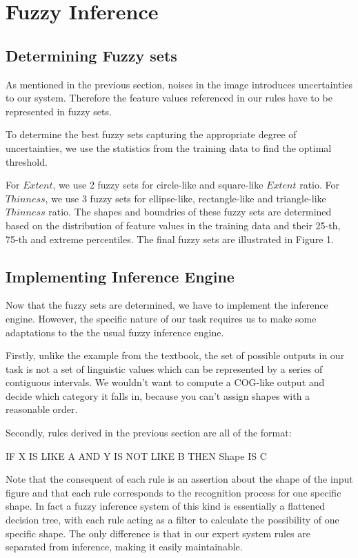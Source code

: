 \section{Fuzzy Inference}

\subsection{Determining Fuzzy sets}

As mentioned in the previous section, noises in the image introduces uncertainties to our system. Therefore the feature values referenced in our rules have to be represented in fuzzy sets.

To determine the best fuzzy sets capturing the appropriate degree of uncertainties, we use the statistics from the training data to find the optimal threshold.

For $Extent$, we use 2 fuzzy sets for circle-like and square-like $Extent$ ratio. For $Thinness$, we use 3 fuzzy sets for ellipse-like, rectangle-like and triangle-like $Thinness$ ratio. The shapes and boundries of these fuzzy sets are determined based on the distribution of feature values in the training data and their 25-th, 75-th and extreme percentiles. The final fuzzy sets are illustrated in Figure 1.

\subsection{Implementing Inference Engine}

Now that the fuzzy sets are determined, we have to implement the inference engine. However, the specific nature of our task requires us to make some adaptations to the the usual fuzzy inference engine.

Firstly, unlike the example from the textbook, the set of possible outputs in our task is not a set of linguistic values which can be represented by a series of contiguous intervals. We wouldn't want to compute a COG-like output and decide which category it falls in, because you can't assign shapes with a reasonable order.

Secondly, rules derived in the previous section are all of the format:

IF X IS LIKE A AND Y IS NOT LIKE B THEN Shape IS C

Note that the consequent of each rule is an assertion about the shape of the input figure and that each rule corresponds to the recognition process for one specific shape. In fact a fuzzy inference system of this kind is essentially a flattened decision tree, with each rule acting as a filter to calculate the possibility of one specific shape. The only difference is that in our expert system rules are separated from inference, making it easily maintainable.


